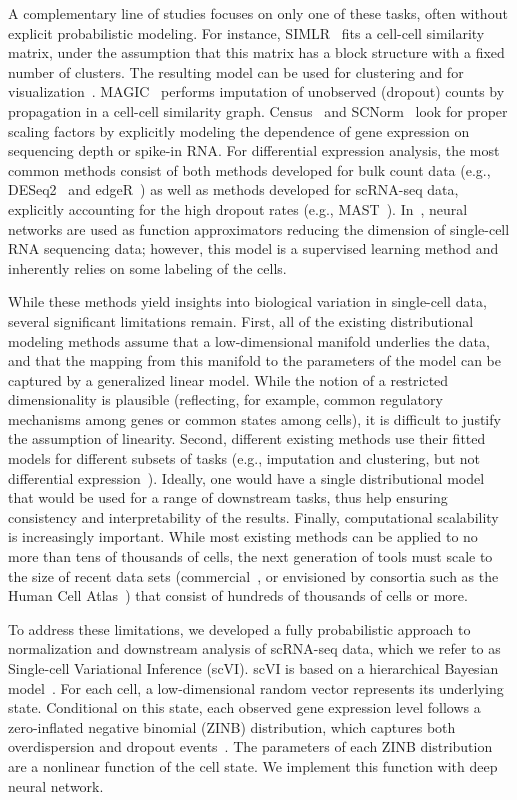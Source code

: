 A complementary line of studies focuses on only one of these tasks, often without explicit probabilistic modeling. For instance, SIMLR~\cite{Wang2017} fits a cell-cell similarity matrix, under the assumption that this matrix has a block structure with a fixed number of clusters. The resulting model can be used for clustering and for visualization~\cite{vanDerMaaten2008}. MAGIC~\cite{magic} performs imputation of unobserved (dropout) counts by propagation in a cell-cell similarity graph. Census~\cite{Qiu2017} and SCNorm~\cite{Bacher2017} look for proper scaling factors by explicitly modeling the dependence of gene expression on sequencing depth or spike-in RNA. For differential expression analysis, the most common methods consist of both methods developed for bulk count data (e.g., DESeq2~\cite{deseq2} and edgeR~\cite{edgeR}) as well as methods developed for scRNA-seq data, explicitly accounting for the high dropout rates (e.g., MAST~\cite{mast}). In~\cite{Lin2017}, neural networks are used as function approximators reducing the dimension of single-cell RNA sequencing data; however, this model is a supervised learning method and inherently relies on some labeling of the cells.

While these methods yield insights into biological variation in single-cell data, several significant limitations remain. First, all of the existing distributional modeling methods assume that a low-dimensional manifold underlies the data, and that the mapping from this manifold to the parameters of the model can be captured by a generalized linear model. While the notion of a restricted dimensionality is plausible (reflecting, for example, common regulatory mechanisms among genes or common states among cells), it is difficult to justify the assumption of linearity. Second, different existing methods use their fitted models for different subsets of tasks (e.g., imputation and clustering, but not differential expression~\cite{biscuit}).  Ideally, one would have a single distributional model that would be used for a range of downstream tasks, thus help ensuring consistency and interpretability of the results. Finally, computational scalability is increasingly important. While most existing methods can be applied to no more than tens of thousands of cells, the next generation of tools must scale to the size of recent data sets (commercial~\cite{10x}, or envisioned by consortia such as the Human Cell Atlas~\cite{Regev2017}) that consist of hundreds of thousands of cells or more. 

To address these limitations, we developed a fully probabilistic approach to normalization and downstream analysis of scRNA-seq data, which we refer to as Single-cell Variational Inference (scVI). scVI is based on a hierarchical Bayesian model~\cite{GelmanHill:2007}.
For each cell, a low-dimensional random vector represents its underlying state. Conditional on this state, each observed gene expression level follows a zero-inflated negative binomial (ZINB) distribution, which captures both overdispersion and dropout events~\cite{Grun2014,deseq2,zinbwave}. The parameters of each ZINB distribution are a nonlinear function of the cell state. We implement this function with deep neural network.

